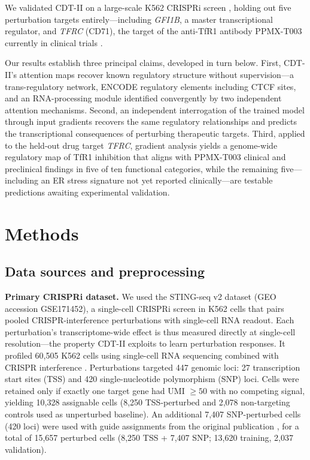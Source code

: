 \documentclass[12pt,a4paper]{article}
\begin{document}
We validated CDT-II on a large-scale K562 CRISPRi screen \citep{gilbert2013,shalem2014,morris2023}, holding out five perturbation targets entirely---including \textit{GFI1B}, a master transcriptional regulator, and \textit{TFRC} (CD71), the target of the anti-TfR1 antibody PPMX-T003 currently in clinical trials \citep{ogama2023}.

Our results establish three principal claims, developed in turn below. First, CDT-II's attention maps recover known regulatory structure without supervision---a trans-regulatory network, ENCODE regulatory elements including CTCF sites, and an RNA-processing module identified convergently by two independent attention mechanisms. Second, an independent interrogation of the trained model through input gradients recovers the same regulatory relationships and predicts the transcriptional consequences of perturbing therapeutic targets. Third, applied to the held-out drug target \textit{TFRC}, gradient analysis yields a genome-wide regulatory map of TfR1 inhibition that aligns with PPMX-T003 clinical and preclinical findings in five of ten functional categories, while the remaining five---including an ER stress signature not yet reported clinically---are testable predictions awaiting experimental validation.

\section{Methods}

\subsection{Data sources and preprocessing}

\textbf{Primary CRISPRi dataset.} We used the STING-seq v2 dataset \citep{morris2023} (GEO accession GSE171452), a single-cell CRISPRi screen in K562 cells that pairs pooled CRISPR-interference perturbations with single-cell RNA readout. Each perturbation's transcriptome-wide effect is thus measured directly at single-cell resolution---the property CDT-II exploits to learn perturbation responses. It profiled 60,505 K562 cells using single-cell RNA sequencing combined with CRISPR interference \citep{gilbert2013,dixit2016}. Perturbations targeted 447 genomic loci: 27 transcription start sites (TSS) and 420 single-nucleotide polymorphism (SNP) loci. Cells were retained only if exactly one target gene had UMI $\geq 50$ with no competing signal, yielding 10,328 assignable cells (8,250 TSS-perturbed and 2,078 non-targeting controls used as unperturbed baseline). An additional 7,407 SNP-perturbed cells (420 loci) were used with guide assignments from the original publication \citep{morris2023}, for a total of 15,657 perturbed cells (8,250 TSS + 7,407 SNP; 13,620 training, 2,037 validation).
\end{document}
